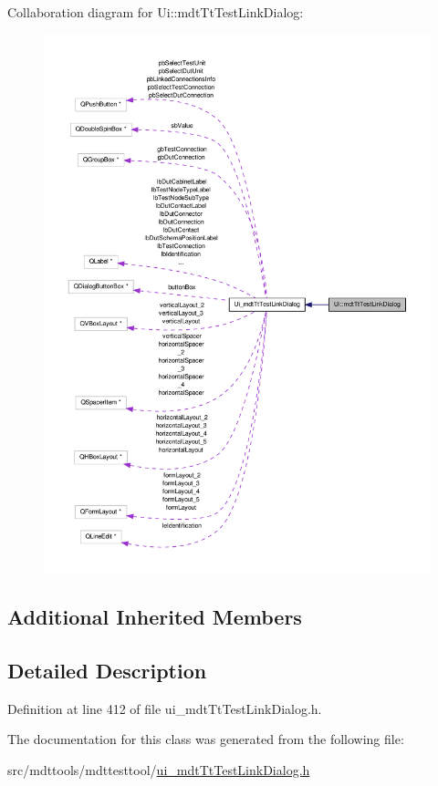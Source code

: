 Collaboration diagram for Ui\-:\-:mdt\-Tt\-Test\-Link\-Dialog\-:
\nopagebreak
\begin{figure}[H]
\begin{center}
\leavevmode
\includegraphics[width=350pt]{class_ui_1_1mdt_tt_test_link_dialog__coll__graph}
\end{center}
\end{figure}
\subsection*{Additional Inherited Members}


\subsection{Detailed Description}


Definition at line 412 of file ui\-\_\-mdt\-Tt\-Test\-Link\-Dialog.\-h.



The documentation for this class was generated from the following file\-:\begin{DoxyCompactItemize}
\item 
src/mdttools/mdttesttool/\hyperlink{ui__mdt_tt_test_link_dialog_8h}{ui\-\_\-mdt\-Tt\-Test\-Link\-Dialog.\-h}\end{DoxyCompactItemize}
